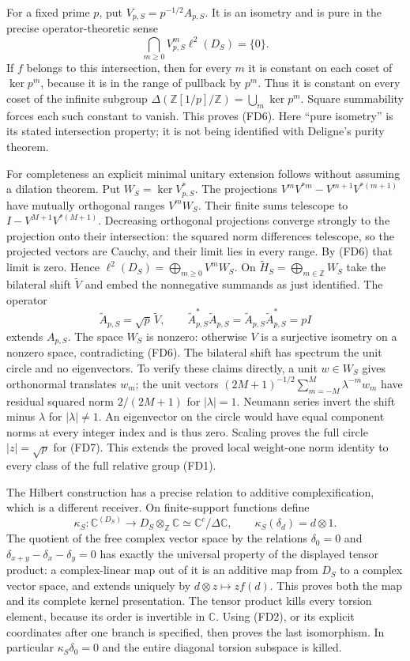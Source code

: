 For a fixed prime $p$, put $V_{p,S}=p^{-1/2}A_{p,S}$. It is an
isometry and is pure in the precise operator-theoretic sense
\[
 \bigcap_{m\ge0}V_{p,S}^m\ell^2(D_S)=\{0\}.
 \tag{FD6}
\]
If $f$ belongs to this intersection, then for every $m$ it is constant
on each coset of $\ker p^m$, because it is in the range of pullback by
$p^m$. Thus it is constant on every coset of the infinite subgroup
$\Delta(\mathbb Z[1/p]/\mathbb Z)=\bigcup_m\ker p^m$.
Square summability forces each such constant to vanish. This proves
(FD6). Here ``pure isometry'' is its stated intersection property;
it is not being identified with Deligne's purity theorem.

For completeness an explicit minimal unitary extension follows without
assuming a dilation theorem. Put $W_S=\ker V_{p,S}^*$. The projections
$V^mV^{*m}-V^{m+1}V^{*(m+1)}$ have mutually orthogonal ranges $V^mW_S$.
Their finite sums telescope to $I-V^{M+1}V^{*(M+1)}$. Decreasing
orthogonal projections converge strongly to the projection onto their
intersection: the squared norm differences telescope, so the projected
vectors are Cauchy, and their limit lies in every range. By (FD6) that
limit is zero. Hence
$\ell^2(D_S)=\bigoplus_{m\ge0}V^mW_S$. On
$\widetilde H_S=\bigoplus_{m\in\mathbb Z}W_S$ take the bilateral
shift $\widetilde V$ and embed the nonnegative summands as just
identified. The operator
\[
 \widetilde A_{p,S}=\sqrt p\,\widetilde V,
 \qquad \widetilde A_{p,S}^*\widetilde A_{p,S}
        =\widetilde A_{p,S}\widetilde A_{p,S}^*=pI
 \tag{FD7}
\]
extends $A_{p,S}$. The space $W_S$ is nonzero: otherwise $V$ is a
surjective isometry on a nonzero space, contradicting (FD6).
The bilateral shift has spectrum the unit circle and no eigenvectors.
To verify these claims directly, a unit $w\in W_S$ gives orthonormal
translates $w_m$; the unit vectors
$(2M+1)^{-1/2}\sum_{m=-M}^M\lambda^{-m}w_m$ have residual squared
norm $2/(2M+1)$ for $|\lambda|=1$. Neumann series invert the shift
minus $\lambda$ for $|\lambda|\ne1$. An eigenvector on the circle
would have equal component norms at every integer index and is thus
zero. Scaling proves the full circle $|z|=\sqrt p$ for (FD7).
This extends the proved local weight-one norm identity to every class
of the full relative group (FD1).

The Hilbert construction has a precise relation to additive
complexification, which is a different receiver. On finite-support
functions define
\[
 \kappa_S:\mathbb C^{(D_S)}\longrightarrow D_S\otimes_{\mathbb Z}\mathbb C
       \simeq\mathbb C^c/\Delta\mathbb C,
 \qquad \kappa_S(\delta_d)=d\otimes1.
 \tag{FD8}
\]
The quotient of the free complex vector space by the relations
$\delta_0=0$ and $\delta_{x+y}-\delta_x-\delta_y=0$ has exactly the
universal property of the displayed tensor product: a complex-linear
map out of it is an additive map from $D_S$ to a complex vector space,
and extends uniquely by $d\otimes z\mapsto z f(d)$. This proves both
the map and its complete kernel presentation. The tensor product kills
every torsion element, because its order is invertible in $\mathbb C$.
Using (FD2), or its explicit coordinates after one branch is specified,
then proves the last isomorphism. In particular $\kappa_S\delta_0=0$
and the entire diagonal torsion subspace is killed.

